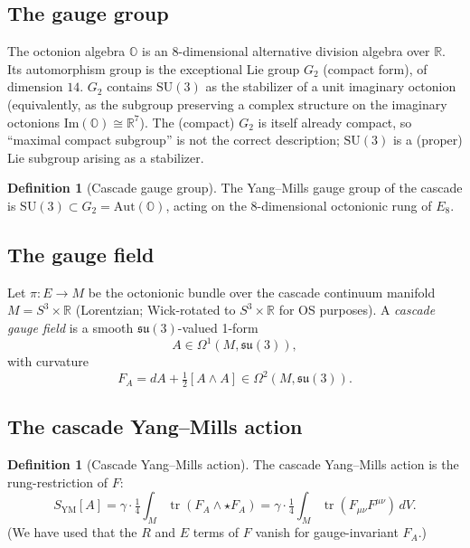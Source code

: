 \documentclass[11pt, a4paper]{amsart}
\theoremstyle{definition}
\newtheorem{definition}[theorem]{Definition}
\newcommand{\R}{\mathbb{R}}
\newcommand{\tr}{\operatorname{tr}}
\begin{document}
\subsection{The gauge group}

The octonion algebra $\mathbb{O}$ is an 8-dimensional alternative
division algebra over $\R$. Its automorphism group is the
exceptional Lie group $G_2$ (compact form), of dimension $14$.
$G_2$ contains $\mathrm{SU}(3)$ as the stabilizer of a unit
imaginary octonion (equivalently, as the subgroup preserving
a complex structure on the imaginary octonions
$\mathrm{Im}(\mathbb{O}) \cong \R^7$). The (compact) $G_2$ is
itself already compact, so ``maximal compact subgroup'' is not
the correct description; $\mathrm{SU}(3)$ is a (proper) Lie
subgroup arising as a stabilizer.

\begin{definition}[Cascade gauge group]
The Yang--Mills gauge group of the cascade is $\mathrm{SU}(3) \subset G_2
= \mathrm{Aut}(\mathbb{O})$, acting on the 8-dimensional
octonionic rung of $E_8$.
\end{definition}

\subsection{The gauge field}

Let $\pi : E \to M$ be the octonionic bundle over the cascade continuum
manifold $M = S^3 \times \R$ (Lorentzian; Wick-rotated to $S^3 \times \R$
for OS purposes). A \emph{cascade gauge field} is a smooth
$\mathfrak{su}(3)$-valued 1-form
\[
A \in \Omega^1(M, \mathfrak{su}(3)),
\]
with curvature
\[
F_A = dA + \tfrac{1}{2}[A \wedge A] \in \Omega^2(M, \mathfrak{su}(3)).
\]

\subsection{The cascade Yang--Mills action}

\begin{definition}[Cascade Yang--Mills action]\label{def:SYM}
The cascade Yang--Mills action is the rung-restriction of $F$:
\begin{equation}
S_{\mathrm{YM}}[A] = \gamma \cdot \tfrac{1}{4} \int_M \tr(F_A \wedge \star F_A)
= \gamma \cdot \tfrac{1}{4} \int_M \tr(F_{\mu\nu} F^{\mu\nu}) \, dV.
\end{equation}
(We have used that the $R$ and $E$ terms of $F$ vanish for
gauge-invariant $F_A$.)
\end{definition}
\end{document}
